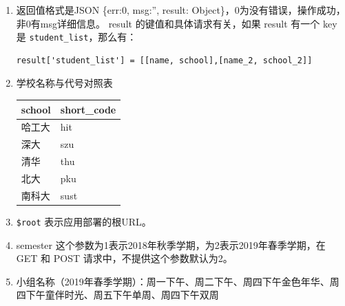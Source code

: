 \documentclass[]{ctexart}
\begin{document}
\begin{enumerate}
\def\labelenumi{\arabic{enumi}.}
\item
  返回值格式是JSON \{err:0, msg:'', result:
  Object\}，0为没有错误，操作成功，非0有msg详细信息。 result
  的键值和具体请求有关，如果 result 有一个 key 是
  \texttt{student\_list}，那么有：
\begin{lstlisting}
result['student_list'] = [[name, school],[name_2, school_2]]
\end{lstlisting}

\item
  学校名称与代号对照表

\begin{longtable}[]{@{}ll@{}}
\toprule
school & short\_code\tabularnewline
\midrule
\endhead
哈工大 & hit\tabularnewline
深大 & szu\tabularnewline
清华 & thu\tabularnewline
北大 & pku\tabularnewline
南科大 & sust\tabularnewline
\bottomrule
\end{longtable}

\item
  \texttt{\$root} 表示应用部署的根URL。
\item
  semester 这个参数为1表示2018年秋季学期，为2表示2019年春季学期，在 GET
  和 POST 请求中，不提供这个参数默认为2。
\item
  小组名称（2019年春季学期）：周一下午、周二下午、周四下午金色年华、周四下午童伴时光、周五下午单周、周四下午双周
\end{enumerate}
\end{document}
